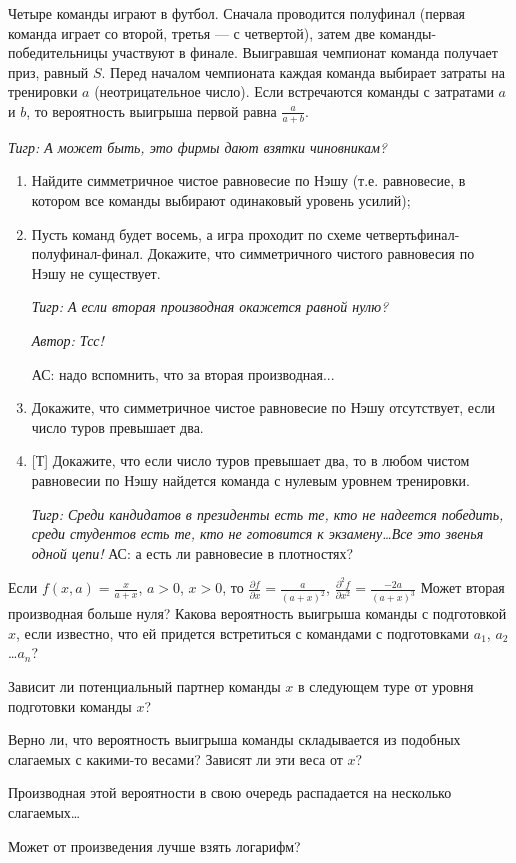 \begin{problem}[Футбол]
Четыре команды играют в футбол. Сначала проводится полуфинал (первая команда играет со второй, третья — с четвертой), затем две команды-победительницы участвуют в финале. Выигравшая чемпионат команда получает приз, равный  $S$. Перед началом чемпионата каждая команда выбирает затраты на тренировки  $a$  (неотрицательное число). Если встречаются команды с затратами  $a$  и  $b$, то вероятность выигрыша первой равна  $\frac{a}{a+b} $.\par
{\it Тигр: А может быть, это фирмы дают взятки чиновникам?}\par
\begin{enumerate}
\item Найдите симметричное чистое равновесие  по Нэшу (т.е. равновесие, в котором все команды выбирают одинаковый уровень усилий);\par
\item Пусть команд будет восемь, а игра проходит по схеме четвертьфинал-полуфинал-финал. Докажите, что симметричного чистого равновесия по Нэшу не существует.\par
{\it Тигр: А если вторая производная  окажется равной нулю?}\par
{\it  Автор: Тсс!}\par
{\red АС: надо вспомнить, что за вторая производная...}
\item  Докажите, что симметричное чистое равновесие по Нэшу отсутствует, если число туров превышает два.\par
\item {[Т]} Докажите, что если число туров превышает два, то в любом чистом равновесии по Нэшу найдется команда с нулевым уровнем тренировки.\par
{\it Тигр: Среди кандидатов в президенты есть те, кто не надеется победить, среди студентов есть те, кто не готовится к экзамену\ldots Все это звенья одной цепи!}
{\red АС: а есть ли равновесие в плотностях?}
\end{enumerate}



\begin{sol}
Если  $f\left(x,a\right)=\frac{x}{a+x} $,  $a>0$,  $x>0$, то  $\frac{\partial f}{\partial x} =\frac{a}{\left(a+x\right)^{2} } $,  $\frac{\partial ^{2} f}{\partial x^{2} } =\frac{-2a}{\left(a+x\right)^{3} } $
Может вторая производная больше нуля?
Какова вероятность выигрыша команды с подготовкой  $x$, если известно, что ей придется встретиться с командами с подготовками  $a_{1} $,  $a_{2} $ \ldots  $a_{n} $? \par
Зависит ли потенциальный партнер команды  $x$  в следующем туре от уровня подготовки команды  $x$?\par
Верно ли, что вероятность выигрыша команды складывается из подобных слагаемых с какими-то весами? Зависят ли эти веса от  $x$?\par
Производная этой вероятности в свою очередь распадается на несколько слагаемых\ldots \par
Может от произведения лучше взять логарифм?
\end{sol}
\end{problem}


